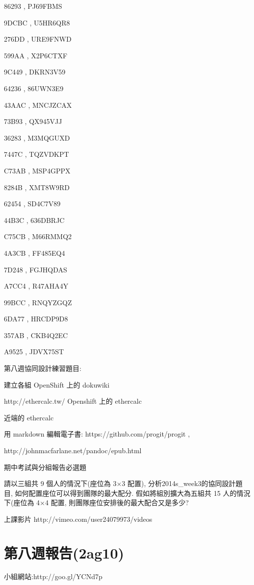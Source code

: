 \documentclass[]{article}
\begin{document}
86293 , PJ69FBMS

9DCBC , U5HR6QR8

276DD , URE9FNWD

599AA , X2P6CTXF

9C449 , DKRN3V59

64236 , 86UWN3E9

43AAC , MNCJZCAX

73B93 , QX945VJJ

36283 , M3MQGUXD

7447C , TQZVDKPT

C73AB , MSP4GPPX

8284B , XMT8W9RD

62454 , SD4C7V89

44B3C , 636DBRJC

C75CB , M66RMMQ2

4A3CB , FF485EQ4

7D248 , FGJHQDAS

A7CC4 , R47AHA4Y

99BCC , RNQYZGQZ

6DA77 , HRCDP9D8

357AB , CKB4Q2EC

A9525 , JDVX75ST

第八週協同設計練習題目:

建立各組 OpenShift 上的 dokuwiki

http://ethercalc.tw/ Openshift 上的 ethercalc

近端的 ethercalc

用 markdown 編輯電子書: https://github.com/progit/progit ,

http://johnmacfarlane.net/pandoc/epub.html

期中考試與分組報告必選題

請以三組共 9 個人的情況下(座位為 3×3 配置),
分析2014s\_week3的協同設計題目, 如何配置座位可以得到團隊的最大配分.
假如將組別擴大為五組共 15 人的情況下(座位為 4×4 配置,
則團隊座位安排後的最大配合又是多少?

上課影片 http://vimeo.com/user24079973/videos

\section{第八週報告(2ag10)}\label{ux7b2cux516bux9031ux5831ux544a2ag10}

小組網站:http://goo.gl/YCNd7p
\end{document}
